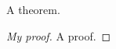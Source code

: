\documentclass{beamer}
\begin{document}
\begin{frame}
    \begin{theorem}[My theorem]
        A theorem.
    \end{theorem}
    \begin{proof}[My proof]
        A proof.
    \end{proof}   
\end{frame}
\end{document}
